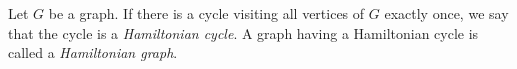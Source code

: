 \documentclass{article}
\begin{document}
Let $G$ be a graph. If there is a cycle visiting all vertices of $G$ exactly once, we say that the cycle is a \emph{Hamiltonian cycle}.  A graph having a Hamiltonian cycle is called a \emph{Hamiltonian graph}.
\end{document}
